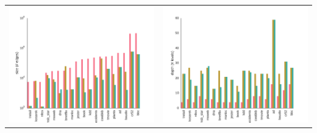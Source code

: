 \documentclass[final]{beamer}
\begin{document}
\begin{frame}{}
\begin{textblock}{25.7}
    \begin{table}[ht]
      \setlength{\tabcolsep}{30pt}  
      \centering
      \begin{tabular}{c c}
        \includegraphics[width=0.4\linewidth]{figures/edges-comp.pdf}&\includegraphics[width=0.4\linewidth]{figures/levels-comp.pdf}
      \end{tabular}
    \end{table}
  



\end{textblock}
\end{frame}
\end{document}
